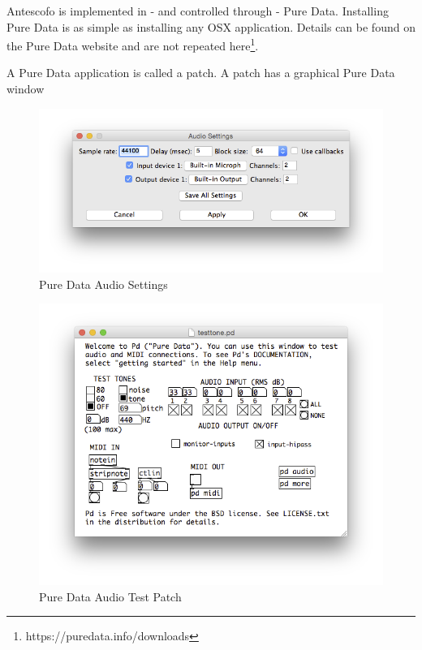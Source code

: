 \documentclass[onecolumn,nocopyrightspace,preprint]{sigplanconf}
\begin{document}

Antescofo is implemented in - and controlled through - Pure Data.
Installing Pure Data is as simple as installing any OSX application. Details can be found
on the Pure Data website and are not repeated here\footnote{https://puredata.info/downloads}.

A Pure Data application is called a patch. A patch has a graphical Pure Data window



\begin{figure}[ht]
    \centering
    \includegraphics[scale=0.4]{fig/pd-audio.png}
    \caption{Pure Data Audio Settings}
    \label{fig:pd-audio}
\end{figure}


\begin{figure}[ht]
    \centering
    \includegraphics[scale=0.4]{fig/pd-test.png}
    \caption{Pure Data Audio Test Patch}
    \label{fig:pd-test}
\end{figure}
\end{document}
